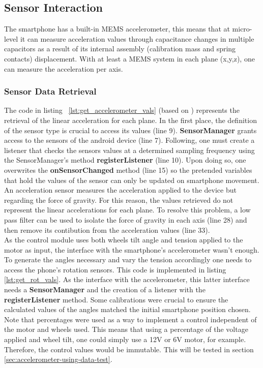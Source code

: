 \subsection{Sensor Interaction}%
\label{sec:accelerometer-access}
%
The smartphone has a built-in MEMS accelerometer, this means that at micro-level it can measure acceleration values through capacitance changes in multiple capacitors as a result of its internal assembly (calibration mass and spring contacts) displacement. With at least a MEMS system in each plane (x,y,z), one can measure the acceleration per axis. 
\subsubsection{Sensor Data Retrieval}
\label{sec:accelerometer-data}
%
The code in listing ~\ref{lst:get_accelerometer_vals} (based on \cite{androiddevsensors}) represents the retrieval of the linear acceleration for each plane.
In the first place, the definition of the sensor type is crucial to access its values (line 9). \textbf{SensorManager} grants access to the sensors of the android device (line 7). Following, one must create a listener that checks the sensors values at a determined sampling frequency using the SensorManager's method \textbf{registerListener} (line 10). Upon doing so, one overwrites the \textbf{onSensorChanged} method (line 15) so the pretended variables that hold the values of the sensor can only be updated on smartphone movement.
An acceleration sensor measures the acceleration applied to the device but regarding the force of gravity. For this reason, the values retrieved do not represent the linear accelerations for each plane. To resolve this problem, a low pass filter can be used to isolate the force of gravity in each axis (line 28) and then remove its contibution from the acceleration values (line 33).\\
%

%
As the control module uses both wheels tilt angle and tension applied to the motor as input, the interface with the smartphone's accelerometer wasn't enough. To generate the angles necessary and vary the tension accordingly one needs to access the phone's rotation sensors. This code is implemented in listing \ref{lst:get_rot_vals}. As the interface with the accelerometer, this latter interface needs a \textbf{SensorManager} and the creation of a listener with the \textbf{registerListener} method. Some calibrations were crucial to ensure the calculated values of the angles matched the initial smartphone position chosen. Note that percentages were used as a way to implement a control independent of the motor and wheels used. This means that using a percentage of the voltage applied and wheel tilt, one could simply use a 12V or 6V motor, for example. Therefore, the control values would be immutable. This will be tested in section \ref{sec:accelerometer-using-data-test}.\\

